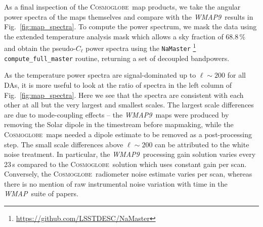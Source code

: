 \documentclass[twocolumn]{../../common/aa}
\def\WMAP{\emph{WMAP}}
\def\WMAPnine{\emph{WMAP9}}
\newcommand{\cosmoglobe}{\textsc{Cosmoglobe}}
\newcommand{\K}[0]{\textit K}
\begin{document}







As a final inspection of the \cosmoglobe\ map products, we take the angular power spectra of the maps themselves and compare with the \WMAPnine\ results in Fig.~\ref{fig:map_spectra}. To compute the power spectrum, we mask the data using the extended temperature analysis mask which allows a sky fraction of 68.8\,\% and obtain the pseudo-$C_\ell$ power spectra using the \texttt{NaMaster} \citep{namaster}\footnote{\url{https://github.com/LSSTDESC/NaMaster}} \texttt{compute\_full\_master} routine, returning a set of decoupled bandpowers.

As the temperature power spectra are signal-dominated up to $\ell\sim200$ for all DAs, it is more useful to look at the ratio of spectra in the left column of Fig.~\ref{fig:map_spectra}. Here we see that the spectra are consistent with each other at all but the very largest and smallest scales. The largest scale differences are due to mode-coupling effects -- the \WMAPnine\ maps were produced by removing the Solar dipole in the timestream before mapmaking, while the \cosmoglobe\ maps needed a dipole estimate to be removed as a post-processing step. The small scale differences above $\ell\sim200$ can be attributed to the white noise treatment. In particular, the \WMAPnine\ processing gain solution varies every 23\,s compared to the \cosmoglobe\ solution which uses constant gain per scan. Conversely, the \cosmoglobe\ radiometer noise estimate varies per scan, whereas there is no mention of raw instrumental noise variation with time in the \WMAP\ suite of papers.


\end{document}
